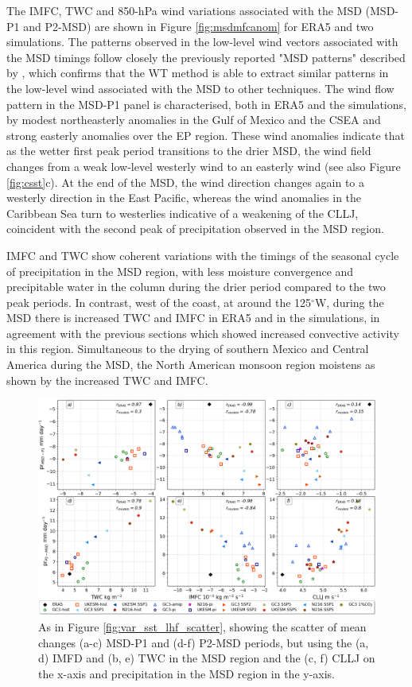 The IMFC, TWC and 850-hPa wind variations associated with the MSD (MSD-P1 and P2-MSD) are shown in Figure \ref{fig:msdmfcanom} for ERA5 and two simulations. The patterns observed in the low-level wind vectors associated with the MSD timings follow closely the previously reported "MSD patterns" described by \cite{zermeno2019}, which confirms that the WT method is able to extract similar patterns in the low-level wind associated with the MSD to other techniques. 
The wind flow pattern in the MSD-P1 panel is characterised, both  in ERA5 and the simulations, by modest northeasterly anomalies in the Gulf of Mexico and the CSEA and strong easterly anomalies over the EP region. These wind anomalies indicate that as the wetter first peak period transitions to the drier MSD, the wind field changes from a weak low-level westerly wind to an easterly wind (see also Figure \ref{fig:csst}c). 
At the end of the MSD, the wind direction changes again to a westerly direction in the East Pacific, whereas the wind anomalies in the Caribbean Sea turn to westerlies indicative of a weakening of the CLLJ, coincident with the second peak of precipitation observed in the MSD region.

IMFC and TWC show coherent variations with the timings of the seasonal cycle of precipitation in the MSD region, with less moisture convergence and precipitable water in the column during the drier period compared to the two peak periods. 
 In contrast, west of the coast, at around the 125$^\circ$W, during the MSD there is increased TWC and IMFC in ERA5 and in the simulations, in agreement with the previous sections which showed increased convective activity in this region. Simultaneous to the drying of southern Mexico and Central America during the MSD, the North American monsoon region moistens as shown by the increased TWC and IMFC. 

 \begin{figure}[t!]
\includegraphics[width=\linewidth]{figures/imfd_scatter}
\caption[Scatterplot of TWC, IMFD and CLLJ]{As in Figure \ref{fig:var_sst_lhf_scatter}, showing the scatter of mean changes (a-c) MSD-P1 and (d-f) P2-MSD periods, but using the (a, d) IMFD and (b, e) TWC in the MSD region and the (c, f) CLLJ on the x-axis and precipitation in the MSD region in the y-axis.  }
\label{fig:imfd_scatter}
\end{figure}


